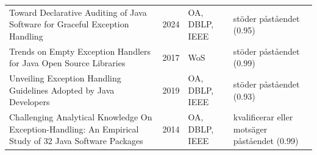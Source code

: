 \begin{longtable}{@{}%
  >{\raggedright\arraybackslash}p{}c%
  >{\raggedright\arraybackslash}p{}%
  >{\raggedright\arraybackslash}p{}@{}}
Toward Declarative Auditing of Java Software for Graceful Exception Handling & 2024 & OA, DBLP, IEEE & stöder påståendet (0.95) \\
Trends on Empty Exception Handlers for Java Open Source Libraries & 2017 & WoS & stöder påståendet (0.99) \\
Unveiling Exception Handling Guidelines Adopted by Java Developers & 2019 & OA, DBLP, IEEE & stöder påståendet (0.93) \\
Challenging Analytical Knowledge On Exception-Handling: An Empirical Study of 32 Java Software Packages & 2014 & OA, DBLP, IEEE & kvalificerar eller motsäger påståendet (0.99) \\
\end{longtable}
\endgroup
